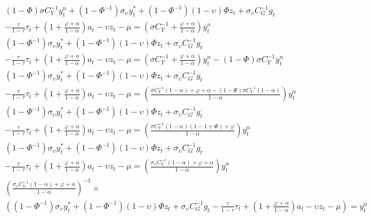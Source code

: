 \begin{align}    
    &(1 - \Phi)\sigma C_Y^{-1} y^n_t +(1 - \Phi^{-1}) \sigma_\upsilon y^*_t + (1 - \Phi^{-1}) (1-\upsilon)\Phi z_t + \sigma_\upsilon C_G^{-1} g_t \nonumber \\
        &- \frac{\tau}{1-\tau}\tau_t  + \left(1 + \frac{\varphi + \alpha}{1-\alpha}\right)a_t - \upsilon z_t -\mu = \left(\sigma C_Y^{-1} + \frac{\varphi + \alpha}{1-\alpha}\right)y^n_t\\
    &(1 - \Phi^{-1}) \sigma_\upsilon y^*_t + (1 - \Phi^{-1}) (1-\upsilon)\Phi z_t + \sigma_\upsilon C_G^{-1} g_t \nonumber \\ 
        &- \frac{\tau}{1-\tau}\tau_t  + \left(1 + \frac{\varphi + \alpha}{1-\alpha}\right)a_t - \upsilon z_t -\mu = \left(\sigma C_Y^{-1} + \frac{\varphi + \alpha}{1-\alpha}\right)y^n_t - (1 - \Phi)\sigma C_Y^{-1} y^n_t\\
    &(1 - \Phi^{-1}) \sigma_\upsilon y^*_t + (1 - \Phi^{-1}) (1-\upsilon)\Phi z_t + \sigma_\upsilon C_G^{-1} g_t \nonumber \\ 
        &- \frac{\tau}{1-\tau}\tau_t  + \left(1 + \frac{\varphi + \alpha}{1-\alpha}\right)a_t - \upsilon z_t -\mu = \left(\frac{\sigma C_Y^{-1}(1-\alpha) + \varphi + \alpha-(1-\Phi)\sigma C_Y^{-1}(1-\alpha)}{1-\alpha}\right)y^n_t\\
    &(1 - \Phi^{-1}) \sigma_\upsilon y^*_t + (1 - \Phi^{-1}) (1-\upsilon)\Phi z_t + \sigma_\upsilon C_G^{-1} g_t \nonumber \\ 
        &- \frac{\tau}{1-\tau}\tau_t  + \left(1 + \frac{\varphi + \alpha}{1-\alpha}\right)a_t - \upsilon z_t -\mu = \left(\frac{\sigma C_Y^{-1}(1-\alpha)(1 - 1 + \Phi) + \varphi}{1-\alpha}\right)y^n_t\\
    &(1 - \Phi^{-1}) \sigma_\upsilon y^*_t + (1 - \Phi^{-1}) (1-\upsilon)\Phi z_t + \sigma_\upsilon C_G^{-1} g_t \nonumber \\ 
        &- \frac{\tau}{1-\tau}\tau_t  + \left(1 + \frac{\varphi + \alpha}{1-\alpha}\right)a_t - \upsilon z_t -\mu = \left(\frac{\sigma_\upsilon C_Y^{-1}(1-\alpha) + \varphi + \alpha}{1-\alpha}\right)y^n_t\\
    &\left(\frac{\sigma_\upsilon C_Y^{-1}(1-\alpha) + \varphi + \alpha}{1-\alpha}\right)^{-1}\times \nonumber \\ 
        &\left((1 - \Phi^{-1}) \sigma_\upsilon y^*_t + (1 - \Phi^{-1}) (1-\upsilon)\Phi z_t + \sigma_\upsilon C_G^{-1} g_t - \frac{\tau}{1-\tau}\tau_t  + \left(1 + \frac{\varphi + \alpha}{1-\alpha}\right)a_t - \upsilon z_t -\mu \right)= y^n_t\\

\end{align}
